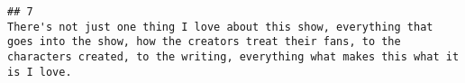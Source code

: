 \documentclass[
]{article}
\begin{document}
\begin{verbatim}
## 7                                                                                                                                                                                                                                                                                                                                                                                                                                                                                                                                                                                                                                                                                                                                                                                                                                                                                                                                                                                                                                                                                                                                                                                                                                                                                                                                                                                                                                                                                                                                                                                                                                                                                                                                                                                                                                                                                                                                                                                                                                                                                                                                                                                                                                   There's not just one thing I love about this show, everything that goes into the show, how the creators treat their fans, to the characters created, to the writing, everything what makes this what it is I love.

\end{verbatim}
\end{document}
